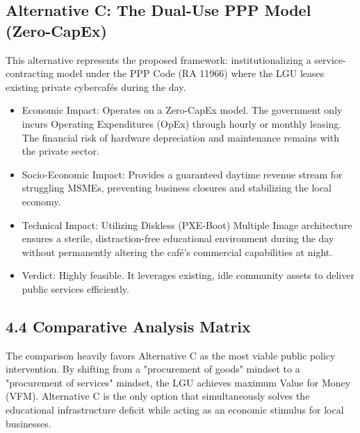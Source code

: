 \subsection{Alternative C: The Dual-Use PPP Model (Zero-CapEx)}
This alternative represents the proposed framework: institutionalizing a service-contracting model under the PPP Code (RA 11966) where the LGU leases existing private cybercafés during the day.

\begin{itemize}
    \item Economic Impact: Operates on a Zero-CapEx model. The government only incurs Operating Expenditures (OpEx) through hourly or monthly leasing. The financial risk of hardware depreciation and maintenance remains with the private sector.
    \item Socio-Economic Impact: Provides a guaranteed daytime revenue stream for struggling MSMEs, preventing business closures and stabilizing the local economy.
    \item Technical Impact: Utilizing Diskless (PXE-Boot) Multiple Image architecture ensures a sterile, distraction-free educational environment during the day without permanently altering the café's commercial capabilities at night.
    \item Verdict: Highly feasible. It leverages existing, idle community assets to deliver public services efficiently.
\end{itemize}

\subsection{4.4 Comparative Analysis Matrix}
The comparison heavily favors Alternative C as the most viable public policy intervention. By shifting from a "procurement of goods" mindset to a "procurement of services" mindset, the LGU achieves maximum Value for Money (VFM). Alternative C is the only option that simultaneously solves the educational infrastructure deficit while acting as an economic stimulus for local businesses.